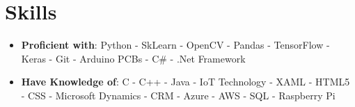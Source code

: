 \documentclass[letterpaper,11pt]{article}
\newcommand{\resumeSubHeadingListStart}{\begin{itemize}[leftmargin=*]}
\newcommand{\resumeSubHeadingListEnd}{\end{itemize}}
\begin{document}
\section{Skills}
  \resumeSubHeadingListStart
     \item{
    	\textbf{Proficient with}{: Python  -  SkLearn - OpenCV -  Pandas - TensorFlow - Keras - Git - Arduino PCBs - C\# - .Net Framework}
    }
    
    \item{
    	\textbf{Have Knowledge of}{: C - C++ - Java - IoT Technology - XAML -  HTML5 - CSS - Microsoft Dynamics - CRM - Azure - AWS - SQL - Raspberry Pi}
    	
    }
 \resumeSubHeadingListEnd


\end{document}

